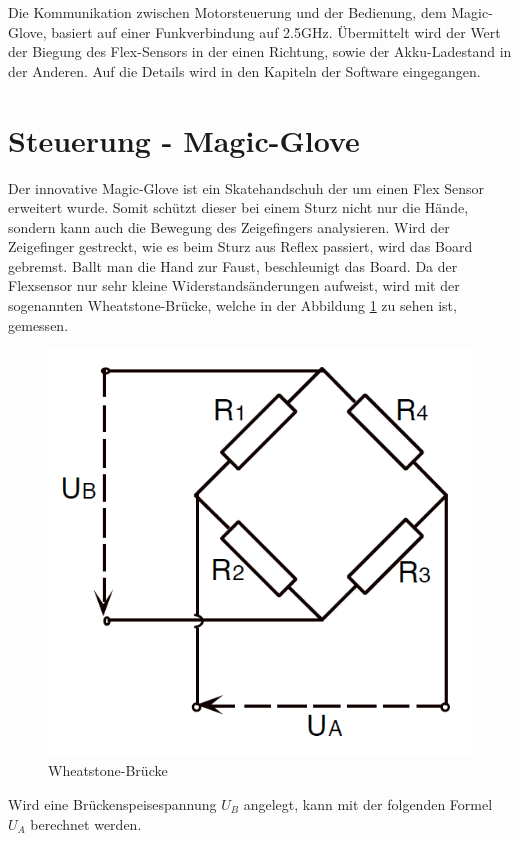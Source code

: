 Die Kommunikation zwischen Motorsteuerung und der Bedienung, dem Magic-Glove, basiert auf einer Funkverbindung auf 2.5GHz. Übermittelt wird der Wert der Biegung des Flex-Sensors in der einen Richtung, sowie der Akku-Ladestand in der Anderen. Auf die Details wird in den Kapiteln der Software eingegangen.


%
%


\section{Steuerung - Magic-Glove}
\label{HW_MagicGlove}
Der innovative Magic-Glove ist ein Skatehandschuh der um einen Flex Sensor erweitert wurde. Somit schützt dieser bei einem Sturz nicht nur die Hände, sondern kann auch die Bewegung des Zeigefingers analysieren. Wird der Zeigefinger gestreckt, wie es beim Sturz aus Reflex passiert, wird das Board gebremst. Ballt man die Hand zur Faust, beschleunigt das Board.
Da der Flexsensor nur sehr kleine Widerstandsänderungen aufweist, wird mit der sogenannten Wheatstone-Brücke, welche in der Abbildung \ref{fig:wheatstonebruecke} zu sehen ist, gemessen.
\begin{figure} [H]
	\centering
	\includegraphics[width=.7\linewidth]{images/wheatstone_Bruecke}
	\caption{Wheatstone-Brücke}
	\label{fig:wheatstonebruecke}
\end{figure}
Wird eine Brückenspeisespannung $U_B$ angelegt, kann mit der folgenden Formel $U_A$ berechnet werden. 

